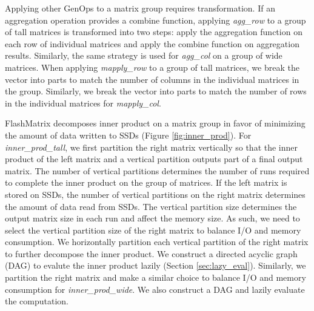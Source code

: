 Applying other GenOps to a matrix group requires transformation. If an aggregation
operation provides a combine function, applying \textit{agg\_row} to a group of
tall matrices is transformed into two steps: apply the aggregation function on
each row of individual matrices and apply the combine function on aggregation
results. Similarly, the same strategy is used for \textit{agg\_col} on a group
of wide matrices. When applying \textit{mapply\_row} to a group of tall matrices,
we break the vector into parts to match the number of columns in the individual
matrices in the group. Similarly, we break the vector into parts to match the number
of rows in the individual matrices for \textit{mapply\_col}.

FlashMatrix decomposes inner product on a matrix group in favor of minimizing
the amount of data written to SSDs (Figure \ref{fig:inner_prod}).
For \textit{inner\_prod\_tall}, we first partition the right matrix vertically
so that the inner product of the left matrix and a vertical partition outputs
part of a final output matrix. The number of vertical partitions determines
the number of runs required to complete the inner product on the group of matrices.
If the left matrix is stored on SSDs, the number of vertical partitions on
the right matrix determines the amount of data read from SSDs. The vertical
partition size determines the output matrix size in each run and affect
the memory size. As such, we need to select the vertical partition size of
the right matrix to balance I/O and memory consumption. We horizontally partition
each vertical partition of the right matrix to further decompose the inner
product. We construct a directed acyclic graph (DAG) to evalute the inner
product lazily (Section \ref{sec:lazy_eval}). Similarly, we partition the right
matrix and make a similar choice to balance I/O and memory consumption for
\textit{inner\_prod\_wide}. We also construct a DAG and lazily evaluate
the computation.

